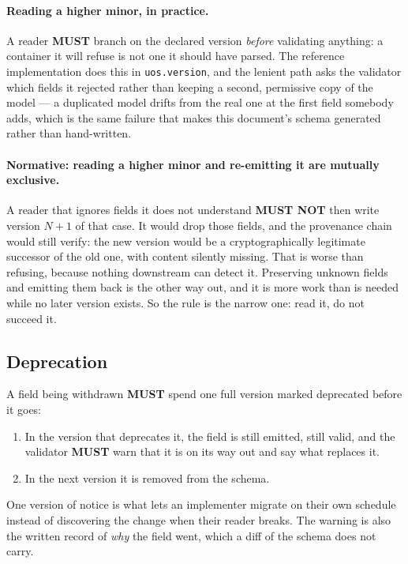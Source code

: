 \documentclass[11pt,a4paper]{article}
\newcommand{\MUST}{\textcolor{uosred}{\textbf{MUST}}}
\newcommand{\MUSTNOT}{\textcolor{uosred}{\textbf{MUST NOT}}}
\newcommand{\code}[1]{\texttt{\small #1}}
\begin{document}
\paragraph{Reading a higher minor, in practice.} A reader \MUST{} branch on the declared
version \emph{before} validating anything: a container it will refuse is not one it should
have parsed. The reference implementation does this in \code{uos.version}, and the lenient
path asks the validator which fields it rejected rather than keeping a second, permissive
copy of the model --- a duplicated model drifts from the real one at the first field
somebody adds, which is the same failure that makes this document's schema generated rather
than hand-written.

\paragraph{Normative: reading a higher minor and re-emitting it are mutually exclusive.}
A reader that ignores fields it does not understand \MUSTNOT{} then write version $N{+}1$
of that case. It would drop those fields, and the provenance chain would still verify: the
new version would be a cryptographically legitimate successor of the old one, with content
silently missing. That is worse than refusing, because nothing downstream can detect it.
Preserving unknown fields and emitting them back is the other way out, and it is more work
than is needed while no later version exists. So the rule is the narrow one: read it, do
not succeed it.

\subsection{Deprecation}

A field being withdrawn \MUST{} spend one full version marked deprecated before it goes:

\begin{enumerate}
  \item In the version that deprecates it, the field is still emitted, still valid, and the
  validator \MUST{} warn that it is on its way out and say what replaces it.
  \item In the next version it is removed from the schema.
\end{enumerate}

One version of notice is what lets an implementer migrate on their own schedule instead of
discovering the change when their reader breaks. The warning is also the written record of
\emph{why} the field went, which a diff of the schema does not carry.
\end{document}
